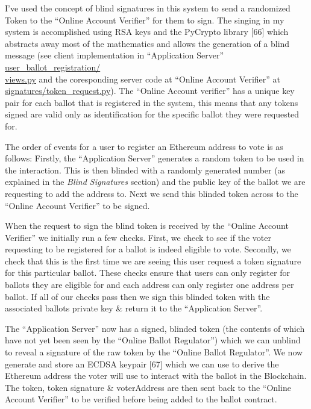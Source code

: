 \documentclass{article}
\begin{document}
I've used the concept of blind signatures in this system to send a randomized Token to the ``Online Account Verifier'' for them to sign. The singing in my system is accomplished using RSA keys and the PyCrypto library {\Large [66]} which abstracts away most of the mathematics and allows the generation of a blind message (see client implementation in ``Application Server'' \href{https://github.com/Mattie432/Blockchain-Voting-System/blob/master/Programming/2_ApplicationServer/user_ballot_registration/views.py#L135}{user\_ballot\_registration/\\views.py} and the coresponding server code at ``Online Account Verifier'' at \href{https://github.com/Mattie432/Blockchain-Voting-System/blob/master/Programming/3_OnlineAccountVerifier/signatures/token_request.py}{signatures/token\_request.py}). The ``Online Account verifier'' has a unique key pair for each ballot that is registered in the system, this means that any tokens signed are valid only as identification for the specific ballot they were requested for.

The order of events for a user to register an Ethereum address to vote is as follows: Firstly, the ``Application Server'' generates a random token to be used in the interaction. This is then blinded with a randomly generated number (as explained in the \textit{Blind Signatures} section) and the public key of the ballot we are requesting to add the address to. Next we send this blinded token across to the ``Online Account Verifier'' to be signed.

When the request to sign the blind token is received by the ``Online Account Verifier'' we initially run a few checks. First, we check to see if the voter requesting to be registered for a ballot is indeed eligible to vote. Secondly, we check that this is the first time we are seeing this user request a token signature for this particular ballot. These checks ensure that users can only register for ballots they are eligible for and each address can only register one address per ballot. If all of our checks pass then we sign this blinded token with the associated ballots private key \& return it to the ``Application Server''.

The ``Application Server'' now has a signed, blinded token (the contents of which have not yet been seen by the ``Online Ballot Regulator'') which we can unblind to reveal a signature of the raw token by the ``Online Ballot Regulator''. We now generate and store an ECDSA keypair {\Large [67]} which we can use to derive the Ethereum address the voter will use to interact with the ballot in the Blockchain. The token, token signature \& voterAddress are then sent back to the ``Online Account Verifier'' to be verified before being added to the ballot contract.
\end{document}
